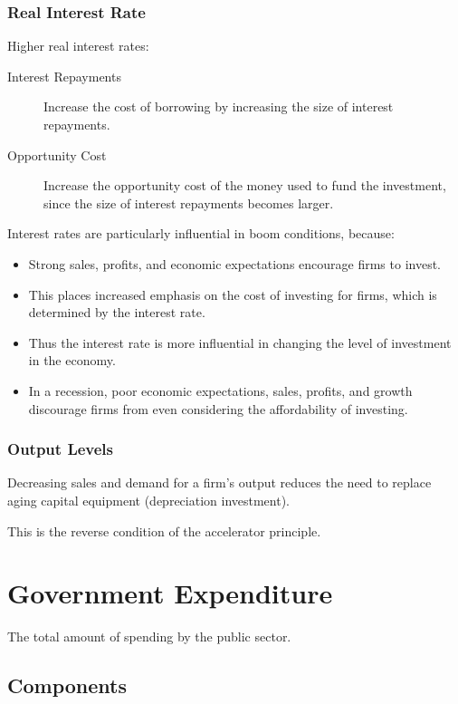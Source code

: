 \documentclass[a4paper,11pt]{report}
\begin{document}
\subsubsection{Real Interest Rate}

Higher real interest rates:

\begin{description}
\item [Interest Repayments] Increase the cost of borrowing by increasing the
	size of interest repayments.
\item [Opportunity Cost] Increase the opportunity cost of the money used to
	fund the investment, since the size of interest repayments becomes larger.
\end{description}

Interest rates are particularly influential in boom conditions, because:

\begin{itemize}
\item Strong sales, profits, and economic expectations encourage firms to
	invest.
\item This places increased emphasis on the cost of investing for firms, which
	is determined by the interest rate.
\item Thus the interest rate is more influential in changing the level of
	investment in the economy.
\item In a recession, poor economic expectations, sales, profits, and growth
	discourage firms from even considering the affordability of investing.
\end{itemize}

\subsubsection{Output Levels}

Decreasing sales and demand for a firm's output reduces the need to replace
aging capital equipment (depreciation investment).

This is the reverse condition of the accelerator principle.


\section{Government Expenditure}

The total amount of spending by the public sector.

\subsection{Components}
\end{document}
